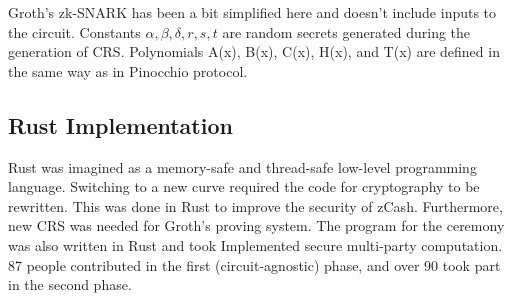 Groth's zk-SNARK has been a bit simplified here and doesn't include inputs to the circuit. Constants $\alpha, \beta, \delta, r, s, t$ are random secrets generated during the generation of CRS. Polynomials A(x), B(x), C(x), H(x), and T(x) are defined in the same way as in Pinocchio\cite{parno2013pinocchio} protocol.

\subsection{Rust Implementation}

Rust \cite{rustlang} was imagined as a memory-safe and thread-safe low-level programming language. Switching to a new curve required the code for cryptography to be rewritten. This was done in Rust to improve the security of zCash\cite{zcashbellman}. Furthermore, new CRS was needed for Groth's proving system. The program for the ceremony was also written in Rust and took Implemented secure multi-party computation. 87 people contributed in the first (circuit-agnostic) phase, and over 90 took part in the second phase\cite{zcashparamgen}.